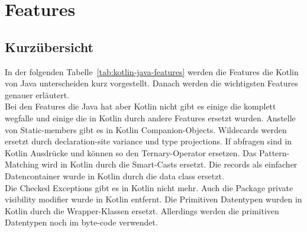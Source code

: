 \documentclass[11pt]{article}
\begin{document}
    \section{Features}

    \subsection{Kurzübersicht}

    In der folgenden Tabelle~\ref{tab:kotlin-java-features} werden die Features die Kotlin von Java unterscheiden kurz vorgestellt. Danach werden die
    wichtigsten Features genauer erläutert. \\
    Bei den Features die Java hat aber Kotlin nicht gibt es einige die komplett wegfalle und einige die in Kotlin durch andere Features ersetzt wurden.
    Anstelle von Static-members gibt es in Kotlin Companion-Objects. Wildecards werden ersetzt durch declaration-site variance und type projections.
    If abfragen sind in Kotlin Ausdrücke und können so den Ternary-Operator ersetzen. Das Pattern-Matching wird in Kotlin durch die Smart-Casts ersetzt.
    Die records als einfacher Datencontainer wurde in Kotlin durch die data class ersetzt.\\
    Die Checked Exceptions gibt es in Kotlin nicht mehr. Auch die Package private visibility modifier wurde in Kotlin entfernt.
    Die Primitiven Datentypen wurden in Kotlin durch die Wrapper-Klassen ersetzt. Allerdings werden die primitiven Datentypen noch im byte-code verwendet.\\
    \cite{doc-comparison}
\end{document}
